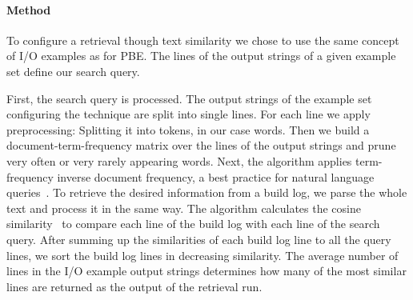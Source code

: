 \documentclass[\myrootdir/main.tex]{subfiles}
\begin{document}
\paragraph{Method}
To configure a retrieval though text similarity we chose to use the same concept of I/O examples as for PBE.
The lines of the output strings of a given example set define our search query.

First, the search query is processed.
The output strings of the example set configuring the technique are split into single lines.
For each line we apply preprocessing: Splitting it into tokens, in our case words.
Then we build a document-term-frequency matrix over the lines of the output strings and prune very often or very rarely appearing words.
Next, the algorithm applies term-frequency inverse document frequency, a best practice for natural language queries~\cite{lee1997document}.
To retrieve the desired information from a build log, we parse the whole text and process it in the same way.
The algorithm calculates the cosine similarity~\cite{korenius2007principal} to compare each line of the build log with each line of the search query.
After summing up the similarities of each build log line to all the query lines, we sort the build log lines in decreasing similarity.
The average number of lines in the I/O example output strings determines how many of the most similar lines are returned as the output of the retrieval run.

\end{document}
